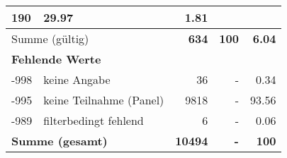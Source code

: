 \begin{longtable}{lXrrr}
       \num{190} &
       \num[round-mode=places,round-precision=2]{29,97} &
         \num[round-mode=places,round-precision=2]{1,81} \\
     \midrule
     \multicolumn{2}{l}{Summe (gültig)} &
       \textbf{\num{634}} &
     \textbf{100} &
       \textbf{\num[round-mode=places,round-precision=2]{6,04}} \\
     \multicolumn{5}{l}{\textbf{Fehlende Werte}}\\
       -998 &
       keine Angabe &
         \num{36} &
        - &
         \num[round-mode=places,round-precision=2]{0,34} \\
       -995 &
       keine Teilnahme (Panel) &
         \num{9818} &
        - &
         \num[round-mode=places,round-precision=2]{93,56} \\
       -989 &
       filterbedingt fehlend &
         \num{6} &
        - &
         \num[round-mode=places,round-precision=2]{0,06} \\
     \midrule
     \multicolumn{2}{l}{\textbf{Summe (gesamt)}} &
          \textbf{\num{10494}} &
        \textbf{-} &
        \textbf{100} \\
     \bottomrule
     \end{longtable}
     

